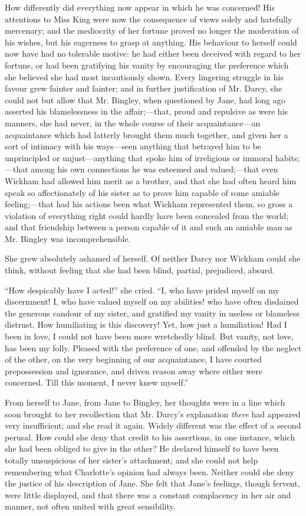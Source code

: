 \documentclass[12pt,openright]{book}
\begin{document}
How differently did everything now appear in which he was concerned! His attentions to Miss King were now the consequence of views solely and hatefully mercenary; and the mediocrity of her fortune proved no longer the moderation of his wishes, but his eagerness to grasp at anything. His behaviour to herself could now have had no tolerable motive: he had either been deceived with regard to her fortune, or had been gratifying his vanity by encouraging the preference which she believed she had most incautiously shown. Every lingering struggle in his favour grew fainter and fainter; and in further justification of Mr. Darcy, she could not but allow that Mr. Bingley, when questioned by Jane, had long ago asserted his blamelessness in the affair;—that, proud and repulsive as were his manners, she had never, in the whole course of their acquaintance—an acquaintance which had latterly brought them much together, and given her a sort of intimacy with his ways—seen anything that betrayed him to be unprincipled or unjust—anything that spoke him of irreligious or immoral habits;—that among his own connections he was esteemed and valued;—that even Wickham had allowed him merit as a brother, and that she had often heard him speak so affectionately of his sister as to prove him capable of some amiable feeling;—that had his actions been what Wickham represented them, so gross a violation of everything right could hardly have been concealed from the world; and that friendship between a person capable of it and such an amiable man as Mr. Bingley was incomprehensible.

She grew absolutely ashamed of herself. Of neither Darcy nor Wickham could she think, without feeling that she had been blind, partial, prejudiced, absurd.

“How despicably have I acted!” she cried. “I, who have prided myself on my discernment! I, who have valued myself on my abilities! who have often disdained the generous candour of my sister, and gratified my vanity in useless or blameless distrust. How humiliating is this discovery! Yet, how just a humiliation! Had I been in love, I could not have been more wretchedly blind. But vanity, not love, has been my folly. Pleased with the preference of one, and offended by the neglect of the other, on the very beginning of our acquaintance, I have courted prepossession and ignorance, and driven reason away where either were concerned. Till this moment, I never knew myself.”

From herself to Jane, from Jane to Bingley, her thoughts were in a line which soon brought to her recollection that Mr. Darcy’s explanation \textit{there} had appeared very insufficient; and she read it again. Widely different was the effect of a second perusal. How could she deny that credit to his assertions, in one instance, which she had been obliged to give in the other? He declared himself to have been totally unsuspicious of her sister’s attachment; and she could not help remembering what Charlotte’s opinion had always been. Neither could she deny the justice of his description of Jane. She felt that Jane’s feelings, though fervent, were little displayed, and that there was a constant complacency in her air and manner, not often united with great sensibility.
\end{document}

